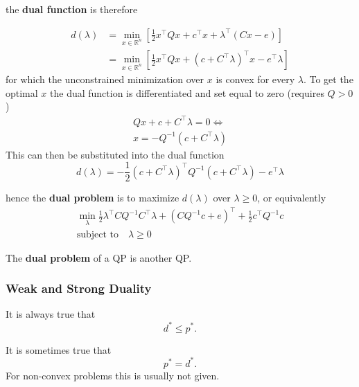 the \textbf{dual function} is therefore

\begin{align*}
    d(\lambda) & = \min_{x\in\mathbb{R}^n}\left[\frac{1}{2}x^\top Q x + c^\top x +  \lambda^\top(Cx-e)\right]              \\
               & =  \min_{x\in\mathbb{R}^n}\left[\frac{1}{2}x^\top Q x + {(c+C^\top\lambda)}^\top x - e^\top\lambda\right]
\end{align*}
for which the unconstrained minimization over $x$ is convex for every $\lambda$. To get the optimal $x$ the dual function is differentiated and set equal to zero (requires $Q>0$)
\begin{gather*}
    Qx + c +C^\top\lambda=0 \Leftrightarrow \\
    x = -Q^{-1}(c + C^\top\lambda)
\end{gather*}
This can then be substituted into the dual function
\begin{equation*}
    d(\lambda) = -\frac{1}{2}{\left(c+C^\top\lambda\right)}^\top Q^{-1}\left(c+C^\top\lambda\right) -e^\top\lambda
\end{equation*}

hence the \textbf{dual problem} is to maximize $d(\lambda)$ over $\lambda\geq0$, or equivalently
\begin{gather*}
    \min_{\lambda} \frac{1}{2}\lambda^\top C Q^{-1}C^\top\lambda+{\left(CQ^{-1}c+e\right)}^\top + \frac{1}{2}c^\top Q^{-1}c \\
    \text{subject to}\quad \lambda \geq 0
\end{gather*}

The \textbf{dual problem} of a QP is another QP.

\subsubsection{Weak and Strong Duality}


It is always true that
\begin{equation*}
    d^* \leq p^*.
\end{equation*}

\newpar{}

It is sometimes true that
\begin{equation*}
    p^* = d^*.
\end{equation*}
For non-convex problems this is usually not given.

\newpar{}

